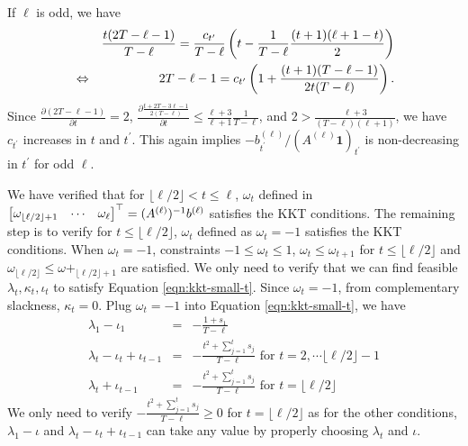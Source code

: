				If $\ell$ is odd, we have 
				\begin{eqnarray*}
					&& \frac{t(2T - \ell-1)}{T - \ell}  = \frac{c_{t^\prime}}{T - \ell} \left(  t - \frac{1}{T - \ell} \frac{(t+1)(\ell+1-t)}{2} \right) \\
					&\Leftrightarrow& 2T - \ell-1 = c_{t^\prime} \left( 1 + \frac{(t+1)(T - \ell-1)}{2t(T - \ell)} \right).
				\end{eqnarray*}
				Since $\frac{\partial (2T - \ell-1)}{\partial t}= 2$, $\frac{\partial \frac{t+2T-3\ell-1}{2(T - \ell)}}{\partial t} \leq \frac{\ell+3}{\ell+1} \frac{1}{T - \ell}$, and $2 > \frac{\ell+3}{(T - \ell)(\ell+1)}$, we have $c_{t^\prime}$ increases in $t$ and $t^\prime$. This again implies $- b^{(\ell)}_{t^\prime}/ (A^{(\ell)} \bm{1})_{t^\prime}$ is non-decreasing in $t^\prime$ for odd $\ell$. 
			
			We have verified that for  $ \lfloor \ell/2 \rfloor < t \leq \ell$,  $\omega_t$ defined in $\begin{bmatrix} \omega_{\lfloor \ell/2 \rfloor+1}  & \cdots &  \omega_{\ell} \end{bmatrix}^\top  = (A^{(\ell)})^{-1} b^{(\ell)}$ satisfies the KKT conditions. The remaining step is to verify for $t \leq \lfloor \ell/2 \rfloor$,  $\omega_t$ defined as $\omega_t = -1$  satisfies the KKT conditions. When $\omega_t = -1$, constraints $-1 \leq \omega_t \leq 1$, $\omega_t \leq \omega_{t+1}$ for $t \leq \lfloor \ell/2 \rfloor$  and $\omega_{ \lfloor \ell/2 \rfloor}\leq \omega+_{ \lfloor \ell/2 \rfloor+1}$ are satisfied. We only need to verify that we can find  feasible $\lambda_t, \kappa_t, \iota_t$ to satisfy Equation  \eqref{eqn:kkt-small-t}. Since $\omega_t = -1$, from complementary slackness, $\kappa_t = 0$. Plug $\omega_t = -1$ into Equation \eqref{eqn:kkt-small-t}, we have 
			\begin{eqnarray*}
				\lambda_1  - \iota_1 &=& -\frac{1+ s_1}{T - \ell} \\
				\lambda_t  - \iota_t + \iota_{t-1} &=& -\frac{t^2 + \sum_{j=1}^t s_j}{T - \ell} \text{ for } t = 2, \cdots \lfloor \ell/2 \rfloor - 1 \\
				\lambda_t   + \iota_{t-1} &=& -\frac{t^2 + \sum_{j=1}^t s_j}{T - \ell} \text{ for } t =  \lfloor \ell/2 \rfloor 
			\end{eqnarray*}
			We only need to verify $-\frac{t^2 + \sum_{j=1}^t s_j}{T - \ell} \geq 0$ for $t = \lfloor \ell/2 \rfloor $ as for the other conditions, $\lambda_1 - \iota$ and $\lambda_t  - \iota_t + \iota_{t-1}$ can take any value by properly choosing $\lambda_t$ and $\iota$. 
			
